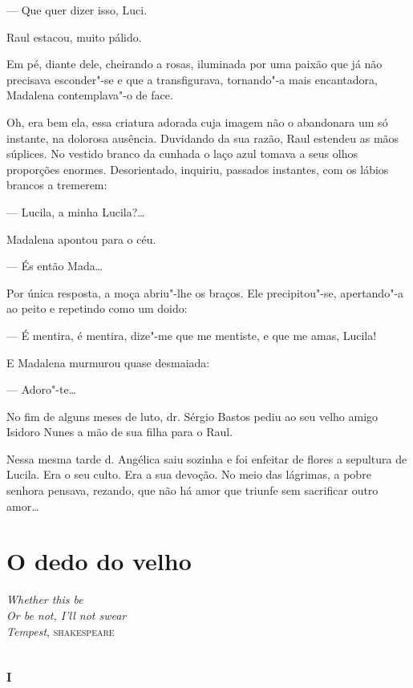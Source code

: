 --- Que quer dizer isso, Luci.

Raul estacou, muito pálido.

Em pé, diante dele, cheirando a rosas, iluminada por uma paixão que já
não precisava esconder"-se e que a transfigurava, tornando"-a mais
encantadora, Madalena contemplava"-o de face.

Oh, era bem ela, essa criatura adorada cuja imagem não o abandonara um
só instante, na dolorosa ausência. Duvidando da sua razão, Raul estendeu
as mãos súplices. No vestido branco da cunhada o laço azul tomava a seus
olhos proporções enormes. Desorientado, inquiriu, passados instantes,
com os lábios brancos a tremerem:

--- Lucila, a minha Lucila?\ldots{}

Madalena apontou para o céu.

--- És então Mada\ldots{}

Por única resposta, a moça abriu"-lhe os braços. Ele precipitou"-se,
apertando"-a ao peito e repetindo como um doido:

--- É mentira, é mentira, dize"-me que me mentiste, e que me amas,
Lucila!

E Madalena murmurou quase desmaiada:

--- Adoro"-te\ldots{}

\asterisc

No fim de alguns meses de luto, dr. Sérgio Bastos pediu ao seu velho
amigo Isidoro Nunes a mão de sua filha para o Raul.

Nessa mesma tarde d. Angélica saiu sozinha e foi enfeitar de flores a
sepultura de Lucila. Era o seu culto. Era a sua devoção. No meio das
lágrimas, a pobre senhora pensava, rezando, que não há amor que triunfe
sem sacrificar outro amor\ldots{}

\chapter{O dedo do velho}

\begin{flushright}
\small\textit{Whether this be\\
Or be not, I'll not swear}\\\emph{Tempest}, \textsc{shakespeare}
\end{flushright}

\section{\textsc{i}}

